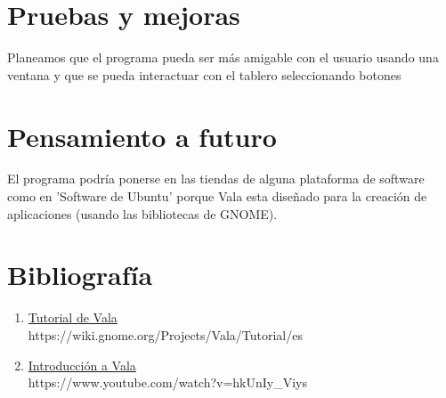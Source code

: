 \documentclass{article}
\begin{document}
    \section{Pruebas y mejoras}    
    Planeamos que el programa pueda ser más amigable con el usuario usando una ventana y que se pueda interactuar con el tablero seleccionando botones
    \section{Pensamiento a futuro}
    El programa podría ponerse en las tiendas de alguna plataforma de software como en 'Software de Ubuntu' porque Vala esta diseñado para la creación de aplicaciones (usando las bibliotecas de GNOME).
    \section*{Bibliografía}
    \newcommand*{\biblio}[2]{\item \href{#2}{#1}\\\textsf{#2}}
    \begin{enumerate}
        \biblio{Tutorial de Vala}{https://wiki.gnome.org/Projects/Vala/Tutorial/es}
        \biblio{Introducción a Vala}{https://www.youtube.com/watch?v=hkUnIy\_Viys}
    \end{enumerate}
\end{document}
